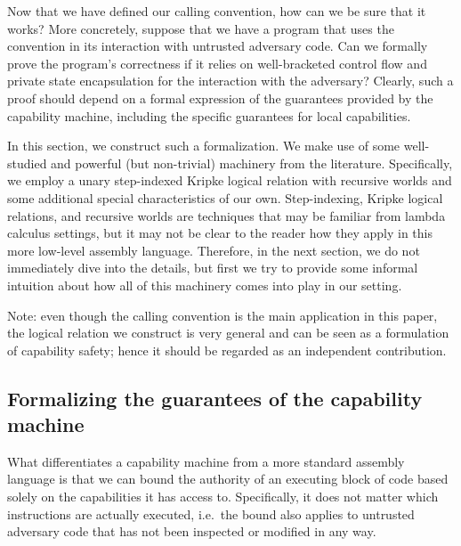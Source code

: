 \documentclass[format=acmsmall, review=true, screen=true]{acmart}
\newenvironment{toplas}{}{}
\begin{document}
\begin{toplas}
Now that we have defined our calling convention, how can we be sure that it
works? More concretely, suppose that we have a program that uses the convention
in its interaction with untrusted adversary code. Can we formally prove the
program's correctness if it relies on well-bracketed control flow and private
state encapsulation for the interaction with the adversary? Clearly, such a
proof should depend on a formal expression of the guarantees provided by the
capability machine, including the specific guarantees for local capabilities.

In this section, we construct such a formalization. We make use of some
well-studied and powerful (but non-trivial) machinery from the literature.
Specifically, we employ a unary step-indexed Kripke logical relation with
recursive worlds and some additional special characteristics of our own.
Step-indexing, Kripke logical relations, and recursive worlds are techniques that
may be familiar from lambda calculus settings, but it may not be clear to the
reader how they apply in this more low-level assembly language. Therefore, in the next section, we do
not immediately dive into the details, but first we try to provide some informal
intuition about how all of this machinery comes into play in our setting.

Note: even though the calling convention is the main application in this paper,
the logical relation we construct is very general and can be seen as a
formulation of capability safety; hence it should be regarded as an
independent contribution.

\subsection{Formalizing the guarantees of the capability machine}
\label{sec:formalizing-guarantees}
What differentiates a capability machine from a more standard assembly language
is that we can bound the authority of an executing block of code based solely
on the capabilities it has access to. Specifically, it does not matter which
instructions are actually executed, i.e.\ the bound also applies to untrusted
adversary code that has not been inspected or modified in any way.


\end{toplas}
\end{document}
